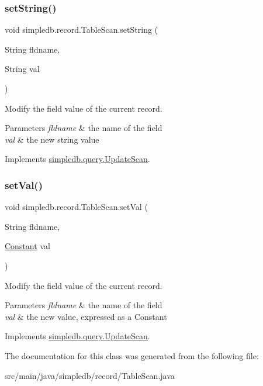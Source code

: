 \subsubsection{\texorpdfstring{set\+String()}{setString()}}
{\footnotesize\ttfamily void simpledb.\+record.\+Table\+Scan.\+set\+String (\begin{DoxyParamCaption}\item[{String}]{fldname,  }\item[{String}]{val }\end{DoxyParamCaption})\hspace{0.3cm}{\ttfamily [inline]}}

Modify the field value of the current record. 
\begin{DoxyParams}{Parameters}
{\em fldname} & the name of the field \\
\hline
{\em val} & the new string value \\
\hline
\end{DoxyParams}


Implements \hyperlink{interfacesimpledb_1_1query_1_1UpdateScan_a06d8414432dac908fd6c5d337e848f95}{simpledb.\+query.\+Update\+Scan}.

\mbox{\label{classsimpledb_1_1record_1_1TableScan_aa43095f81b040417816d8493b66a91d3}} 
\subsubsection{\texorpdfstring{set\+Val()}{setVal()}}
{\footnotesize\ttfamily void simpledb.\+record.\+Table\+Scan.\+set\+Val (\begin{DoxyParamCaption}\item[{String}]{fldname,  }\item[{\hyperlink{classsimpledb_1_1query_1_1Constant}{Constant}}]{val }\end{DoxyParamCaption})\hspace{0.3cm}{\ttfamily [inline]}}

Modify the field value of the current record. 
\begin{DoxyParams}{Parameters}
{\em fldname} & the name of the field \\
\hline
{\em val} & the new value, expressed as a Constant \\
\hline
\end{DoxyParams}


Implements \hyperlink{interfacesimpledb_1_1query_1_1UpdateScan_a70fdd638a395be56dcbc65ecd791f075}{simpledb.\+query.\+Update\+Scan}.



The documentation for this class was generated from the following file\+:\begin{DoxyCompactItemize}
\item 
src/main/java/simpledb/record/Table\+Scan.\+java\end{DoxyCompactItemize}
